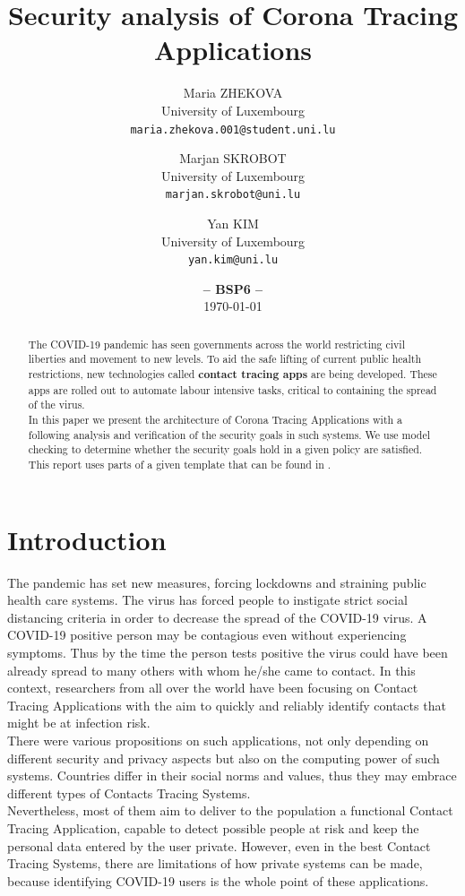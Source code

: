 \documentclass[a4paper, twocolumn]{article}
\title{\textbf{Security analysis of Corona Tracing Applications}}
\date{\textbf{-- BSP6 --}\\ \today}
\author{
    Maria ZHEKOVA\\
    \small University of Luxembourg\\
    \small\texttt{maria.zhekova.001@student.uni.lu}
	\and
    Marjan SKROBOT\\
    \small University of Luxembourg\\
	\small\texttt{marjan.skrobot@uni.lu}
	\and
	Yan KIM\\
	\small University of Luxembourg\\
	\small\texttt{yan.kim@uni.lu}
}
\begin{document}
\maketitle

\begin{abstract}
    \noindent The COVID-19 pandemic has seen governments across the world restricting civil liberties and movement to new levels. To aid the safe lifting of current public health restrictions, new technologies called \textbf{contact tracing apps} are being developed. These apps are rolled out to automate labour intensive tasks, critical to containing the spread of the virus. \\
    In this paper we present the architecture of Corona Tracing Applications with a following analysis and verification of the security goals in such systems. We use model checking to determine whether the security goals hold in a given policy are satisfied. This report uses parts of a given template that can be found in \cite{template}.
\end{abstract}

\section{Introduction}
The pandemic has set new measures, forcing lockdowns and straining public health care systems. The virus has forced people to instigate strict social distancing criteria in order to decrease the spread of the COVID-19 virus. A COVID-19 positive person may be contagious even without experiencing symptoms. Thus by the time the person tests positive the virus could have been already spread to many others with whom he/she came to contact. In this context, researchers from all over the world have been focusing on Contact Tracing Applications with the aim to quickly and reliably identify contacts that might be at infection risk.\\
There were various propositions on such applications, not only depending on different security and privacy aspects but also on the computing power of such systems. Countries differ in their social norms and values, thus they may embrace different types of Contacts Tracing Systems.\\
Nevertheless, most of them aim to deliver to the population a functional Contact Tracing Application, capable to detect possible people at risk and keep the personal data entered by the user private. However, even in the best Contact Tracing Systems, there are limitations of how private systems can be made, because identifying COVID-19 users is the whole point of these applications.
\end{document}
